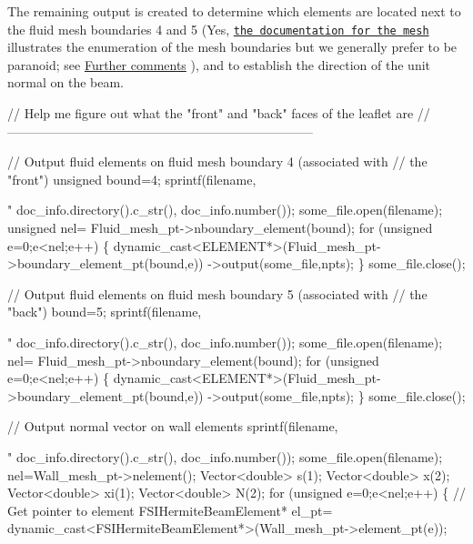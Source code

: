 The remaining output is created to determine which elements are located next to the fluid mesh boundaries 4 and 5 (Yes, \href{../../../meshes/mesh_list/html/index.html#channel_with_leaflet}{\tt the documentation for the mesh} illustrates the enumeration of the mesh boundaries but we generally prefer to be paranoid; see \hyperlink{index_comm}{Further comments} ), and to establish the direction of the unit normal on the beam.


\begin{DoxyCodeInclude}


 \textcolor{comment}{// Help me figure out what the "front" and "back" faces of the leaflet are}
 \textcolor{comment}{//------------------------------------------------------------------------}

 \textcolor{comment}{// Output fluid elements on fluid mesh boundary 4 (associated with}
 \textcolor{comment}{// the "front")}
 \textcolor{keywordtype}{unsigned} bound=4;
 sprintf(filename,\textcolor{stringliteral}{"%
         doc\_info.directory().c\_str(),
         doc\_info.number());
 some\_file.open(filename);
 \textcolor{keywordtype}{unsigned} nel= Fluid\_mesh\_pt->nboundary\_element(bound);
 \textcolor{keywordflow}{for} (\textcolor{keywordtype}{unsigned} e=0;e<nel;e++)
  \{
   \textcolor{keyword}{dynamic\_cast<}ELEMENT*\textcolor{keyword}{>}(Fluid\_mesh\_pt->boundary\_element\_pt(bound,e))
    ->output(some\_file,npts);
  \}
 some\_file.close();


 \textcolor{comment}{// Output fluid elements on fluid mesh boundary 5 (associated with}
 \textcolor{comment}{// the "back")}
 bound=5;
 sprintf(filename,\textcolor{stringliteral}{"%
         doc\_info.directory().c\_str(),
         doc\_info.number());
 some\_file.open(filename);
 nel= Fluid\_mesh\_pt->nboundary\_element(bound);
 \textcolor{keywordflow}{for} (\textcolor{keywordtype}{unsigned} e=0;e<nel;e++)
  \{
   \textcolor{keyword}{dynamic\_cast<}ELEMENT*\textcolor{keyword}{>}(Fluid\_mesh\_pt->boundary\_element\_pt(bound,e))
    ->output(some\_file,npts);
  \}
 some\_file.close();


 \textcolor{comment}{// Output normal vector on wall elements}
 sprintf(filename,\textcolor{stringliteral}{"%
         doc\_info.directory().c\_str(),
         doc\_info.number());
 some\_file.open(filename);
 nel=Wall\_mesh\_pt->nelement();
 Vector<double> s(1);
 Vector<double> x(2);
 Vector<double> xi(1);
 Vector<double> N(2);
 \textcolor{keywordflow}{for} (\textcolor{keywordtype}{unsigned} e=0;e<nel;e++)
  \{
   \textcolor{comment}{// Get pointer to element}
   FSIHermiteBeamElement* el\_pt=
    \textcolor{keyword}{dynamic\_cast<}FSIHermiteBeamElement*\textcolor{keyword}{>}(Wall\_mesh\_pt->element\_pt(e));

}}}
\end{DoxyCodeInclude}
